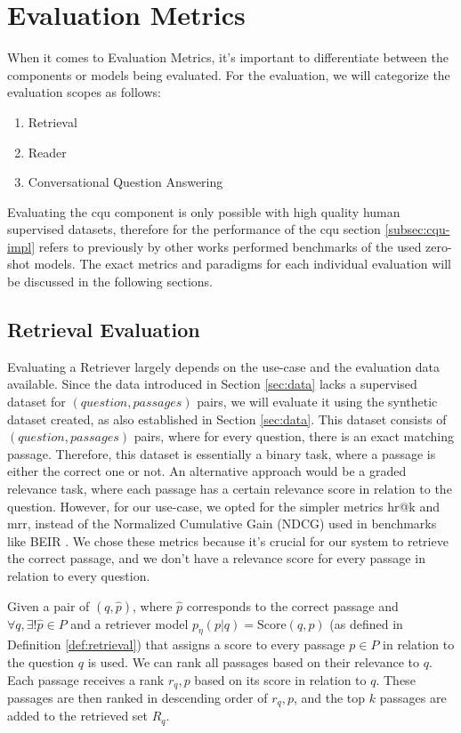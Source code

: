 \section{Evaluation Metrics}
\label{sec:metrics}

When it comes to Evaluation Metrics, it's important to differentiate between the components or models being evaluated. For the evaluation, we will categorize the evaluation scopes as follows:

\begin{enumerate}
    \item Retrieval
    \item Reader
    \item Conversational Question Answering
\end{enumerate}

Evaluating the \gls{cqu} component is only possible with high quality human supervised datasets, therefore for the performance of the \gls{cqu} section \ref{subsec:cqu-impl} refers to previously by other works performed benchmarks of the used zero-shot models. The exact metrics and paradigms for each individual evaluation will be discussed in the following sections.

\subsection{Retrieval Evaluation}
\label{subsec:retrieval-eval}

Evaluating a Retriever largely depends on the use-case and the evaluation data available. Since the data introduced in Section \ref{sec:data} lacks a supervised dataset for $(question,\allowbreak passages)$ pairs, we will evaluate it using the synthetic dataset created, as also established in Section \ref{sec:data}. This dataset consists of $(question, passages)$ pairs, where for every question, there is an exact matching passage. Therefore, this dataset is essentially a binary task, where a passage is either the correct one or not. An alternative approach would be a graded relevance task, where each passage has a certain relevance score in relation to the question. However, for our use-case, we opted for the simpler metrics \gls{hr}@k and \gls{mrr}, instead of the Normalized Cumulative Gain (NDCG) used in benchmarks like BEIR \cite{thakur_beir_2021}. We chose these metrics because it's crucial for our system to retrieve the correct passage, and we don't have a relevance score for every passage in relation to every question.

Given a pair of $(q,\hat{p})$, where $\hat{p}$ corresponds to the correct passage and $\forall q, \exists ! \hat{p} \in P$ and a retriever model $p_\eta(p|q) = \text{Score}(q,p)$ (as defined in Definition \ref{def:retrieval}) that assigns a score to every passage $p \in P$ in relation to the question $q$ is used. We can rank all passages based on their relevance to $q$. Each passage receives a rank $r_q,p$ based on its score in relation to $q$. These passages are then ranked in descending order of $r_q,p$, and the top $k$ passages are added to the retrieved set $R_q$.

